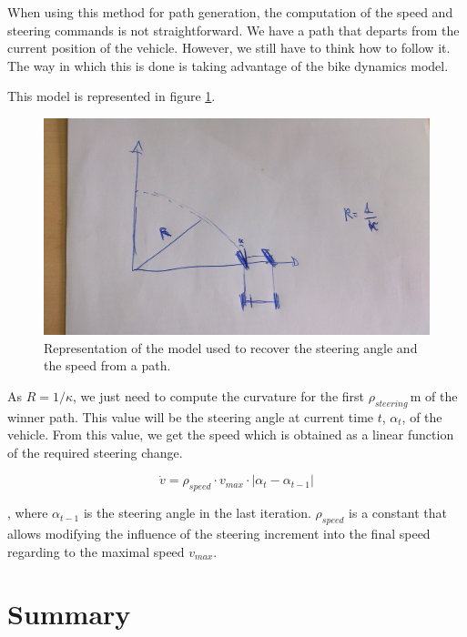 When using this method for path generation, the computation of the speed and steering commands is not straightforward. We have a path that departs from the current position of the vehicle. However, we still have to think how to follow it. The way in which this is done is taking advantage of the bike dynamics model.

This model is represented in figure \ref{fig:cp07_vehicle_commands}.

\begin{figure}[h!]
  \centering
  \includegraphics{vehicle_commands}
  \caption{Representation of the model used to recover the steering angle and the speed from a path.}\label{fig:cp07_vehicle_commands}
\end{figure}

As $R = 1 / \kappa$, we just need to compute the curvature for the first $\rho_{steering}$\,m of the winner path. This value will be the steering angle at current time $t$, $\alpha_{t}$, of the vehicle. From this value, we get the speed which is obtained as a linear function of the required steering change.

\begin{equation}\label{eq:cp07_speed_computation}
\dot{v} = \rho_{speed} \cdot v_{max} \cdot | \alpha_{t} - \alpha_{t - 1}|
\end{equation}

, where $\alpha_{t - 1}$ is the steering angle in the last iteration. $\rho_{speed}$ is a constant that allows modifying the influence of the steering increment into the final speed regarding to the maximal speed $v_{max}$.

\section{Summary}\label{ch:chapter07_03}

